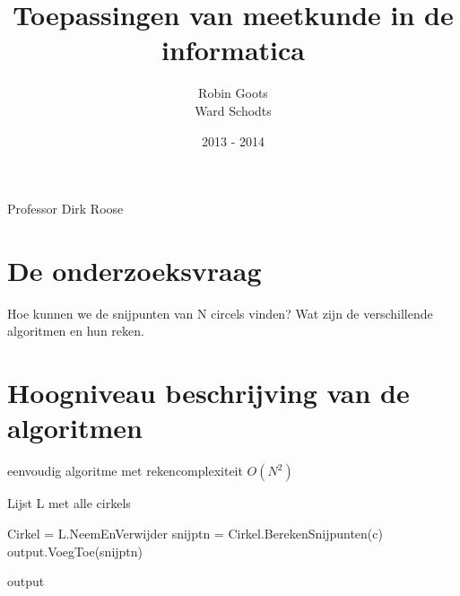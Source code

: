 \documentclass[11pt,a4paper]{article}
\begin{document}
\begin{titlepage}

\title{\Huge Toepassingen van meetkunde in de informatica}

\author{Robin Goots\\
		Ward Schodts\\
		}

\date{2013 - 2014}
\maketitle
\thispagestyle{empty}


\begin{center}
\Large Professor Dirk Roose
\vfill
\end{center}
\end{titlepage}
\section{De onderzoeksvraag}
Hoe kunnen we de snijpunten van N circels vinden? Wat zijn de verschillende algoritmen en hun reken.
\section{Hoogniveau beschrijving van de algoritmen}

\begin{algorithm}
\caption{eenvoudig algoritme met rekencomplexiteit $O(N^2)$}
\begin{algorithmic}
\State Lijst L met alle cirkels

	\State Cirkel = L.NeemEnVerwijder
	\State snijptn = Cirkel.BerekenSnijpunten(c)
	\State output.VoegToe(snijptn)
	\EndFor
\EndWhile

\Return output
\end{algorithmic}
\end{algorithm}
\end{document}
